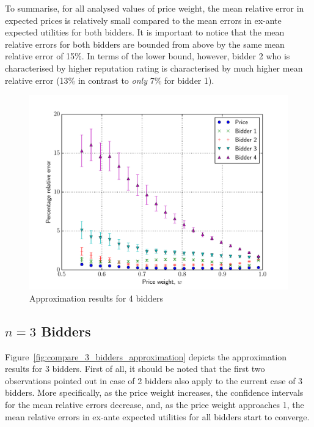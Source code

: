 To summarise, for all analysed values of price weight, the mean relative error in expected prices is relatively small compared to the mean errors in ex-ante expected utilities for both bidders. It is important to notice that the mean relative errors for both bidders are bounded from above by the same mean relative error of 15\%. In terms of the lower bound, however, bidder 2 who is characterised by higher reputation rating is characterised by much higher mean relative error (13\% in contrast to \emph{only} 7\% for bidder 1).

\begin{figure}[t!]
  \includegraphics[width=\figsize]{Approximation/Figures/compare_4_bidders}
  \caption{Approximation results for 4 bidders}
  \label{fig:compare_4_bidders_approximation}
\end{figure}

\subsection{$n=3$ Bidders} %
\label{sub:n_3_bidders_approximation}
Figure~\ref{fig:compare_3_bidders_approximation} depicts the approximation results for 3 bidders. First of all, it should be noted that the first two observations pointed out in case of 2 bidders also apply to the current case of 3 bidders. More specifically, as the price weight increases, the confidence intervals for the mean relative errors decrease, and, as the price weight approaches 1, the mean relative errors in ex-ante expected utilities for all bidders start to converge.

